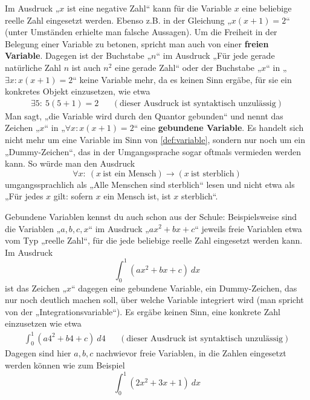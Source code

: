 \begin{bem} \label{gebundenevariable}  
    Im Ausdruck „$x$ ist eine negative Zahl“ kann für die Variable $x$ eine beliebige reelle Zahl eingesetzt werden. Ebenso z.B. in der Gleichung „$x(x+1)=2$“ (unter Umständen erhielte man falsche Aussagen). Um die Freiheit in der Belegung einer Variable zu betonen, spricht man auch von einer \textbf{freien Variable}. Dagegen ist der Buchstabe „$n$“ im Ausdruck „Für jede gerade natürliche Zahl $n$ ist auch $n^2$ eine gerade Zahl“ oder der Buchstabe „$x$“ in „$\exists x: x(x+1)=2$“ keine Variable mehr, da es keinen Sinn ergäbe, für sie ein konkretes Objekt einzusetzen, wie etwa
    \begin{align*}
        \exists 5:\ 5(5+1) = 2 && (\text{dieser Ausdruck ist syntaktisch unzulässig})
    \end{align*}
    Man sagt, „die Variable wird durch den Quantor gebunden“ und nennt das Zeichen „$x$“ in „$\forall x: x(x+1)=2$“ eine \textbf{gebundene Variable}. Es handelt sich nicht mehr um eine Variable im Sinn von \cref{def:variable}, sondern nur noch um ein „Dummy-Zeichen“, das in der Umgangssprache sogar oftmals vermieden werden kann. So würde man den Ausdruck
        \[ \forall x:\ (x\ \text{ist ein Mensch})\to (x\ \text{ist sterblich}) \]
    umgangssprachlich als „Alle Menschen sind sterblich“ lesen und nicht etwa als „Für jedes $x$ gilt: sofern $x$ ein Mensch ist, ist $x$ sterblich“.
    
    Gebundene Variablen kennst du auch schon aus der Schule: Beispielsweise sind die Variablen „$a,b,c,x$“ im Ausdruck „$ax^2 +bx+c$“ jeweils freie Variablen etwa vom Typ „reelle Zahl“, für die jede beliebige reelle Zahl eingesetzt werden kann. Im Ausdruck
        \[ \int_0^1 (ax^2+bx+c)\ dx \]
    ist das Zeichen „$x$“ dagegen eine gebundene Variable, ein Dummy-Zeichen, das nur noch deutlich machen soll, über welche Variable integriert wird (man spricht von der „Integrationsvariable“). Es ergäbe keinen Sinn, eine konkrete Zahl einzusetzen wie etwa
    \begin{align*}
        \int_0^1 (a4^2+b4+c)\ d4 && (\text{dieser Ausdruck ist syntaktisch unzulässig})
    \end{align*}
    Dagegen sind hier $a,b,c$ nachwievor freie Variablen, in die Zahlen eingesetzt werden können wie zum Beispiel
        \[ \int_0^1 (2x^2+3x+1)\ dx\]
\end{bem}


